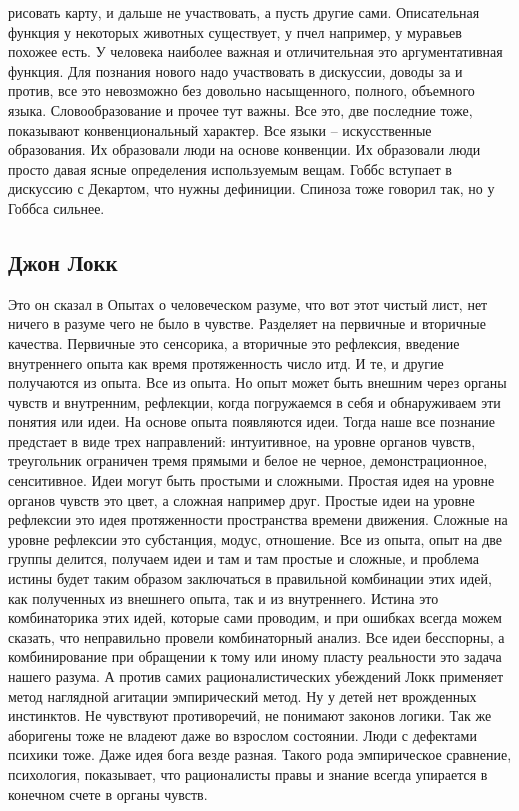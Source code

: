\documentclass[a4paper, 12pt]{article}
\begin{document}
рисовать карту, и дальше не участвовать, а пусть другие сами. 
Описательная функция у некоторых животных существует, у пчел например, 
у муравьев похожее есть. У человека наиболее важная и отличительная это 
аргументативная функция. Для познания нового надо участвовать 
в дискуссии, доводы за и против, все это невозможно без довольно 
насыщенного, полного, объемного языка. Словообразование и прочее тут 
важны. Все это, две последние тоже, показывают конвенциональный 
характер. Все языки -- искусственные образования. Их образовали люди на 
основе конвенции. Их образовали люди просто давая ясные определения 
используемым вещам. Гоббс вступает в дискуссию с Декартом, что нужны 
дефиниции. Спиноза тоже говорил так, но у Гоббса сильнее.

\subsection{Джон Локк}

Это он сказал в Опытах о человеческом разуме, что вот этот чистый лист, 
нет ничего в разуме чего не было в чувстве. Разделяет на первичные 
и вторичные качества. Первичные это сенсорика, а вторичные это 
рефлексия, введение внутреннего опыта как время протяженность число итд. 
И те, и другие получаются из опыта. Все из опыта. Но опыт может быть 
внешним через органы чувств и внутренним, рефлекции, когда погружаемся 
в себя и обнаруживаем эти понятия или идеи. На основе опыта появляются 
идеи. Тогда наше все познание предстает в виде трех направлений: 
интуитивное, на уровне органов чувств, треугольник ограничен тремя 
прямыми и белое не черное, демонстрационное, сенситивное. Идеи могут 
быть простыми и сложными. Простая идея на уровне органов чувств это 
цвет, а сложная например друг. Простые идеи на уровне рефлексии это идея 
протяженности пространства времени движения. Сложные на уровне рефлексии 
это субстанция, модус, отношение. Все из опыта, опыт на две группы 
делится, получаем идеи и там и там простые и сложные, и проблема истины 
будет таким образом заключаться в правильной комбинации этих идей, как 
полученных из внешнего опыта, так и из внутреннего. Истина это 
комбинаторика этих идей, которые сами проводим, и при ошибках всегда 
можем сказать, что неправильно провели комбинаторный анализ. Все идеи 
бесспорны, а комбинирование при обращении к тому или иному пласту 
реальности это задача нашего разума. А против самих рационалистических 
убеждений Локк применяет метод наглядной агитации эмпирический метод. Ну 
у детей нет врожденных инстинктов. Не чувствуют противоречий, не 
понимают законов логики. Так же аборигены тоже не владеют даже во 
взрослом состоянии. Люди с дефектами психики тоже. Даже идея бога везде 
разная. Такого рода эмпирическое сравнение, психология, показывает, что 
рационалисты правы и знание всегда упирается в конечном счете в органы 
чувств.
\end{document}
